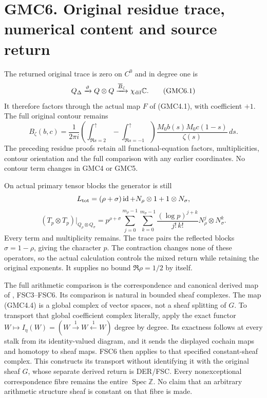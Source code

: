 \section{GMC6. Original residue trace, numerical content and source
return}\label{gmc6.-original-residue-trace-numerical-content-and-source-return}

The returned original trace is zero on \(C^0\) and in degree one is \[
Q_\Delta\xrightarrow{\vartheta}Q\otimes Q
\xrightarrow{\overline B_\zeta}\chi_{\rm dil}\mathbb C.
\tag{GMC6.1}
\] It therefore factors through the actual map \(F\) of (GMC4.1), with
coefficient \(+1\). The full original contour remains \[
B_\zeta(b,c)=\frac{1}{2\pi i}
\left(\int_{\Re s=2}^{\uparrow}-\int_{\Re s=-1}^{\uparrow}\right)
\frac{M_0b(s)M_0c(1-s)}{\zeta(s)}\,ds.
\tag{GMC6.2}
\] The preceding residue proofs retain all functional-equation factors,
multiplicities, contour orientation and the full comparison with any
earlier coordinates. No contour term changes in GMC4 or GMC5.

On actual primary tensor blocks the generator is still \[
L_{\rm tot}=(\rho+\sigma)\operatorname{id}
+N_\rho\otimes1+1\otimes N_\sigma,
\] \[
(T_p\otimes T_p)|_{Q_\rho\otimes Q_\sigma}
=p^{\rho+\sigma}
\sum_{j=0}^{m_\rho-1}\sum_{k=0}^{m_\sigma-1}
\frac{(\log p)^{j+k}}{j!\,k!}N_\rho^j\otimes N_\sigma^k.
\tag{GMC6.3}
\] Every term and multiplicity remains. The trace pairs the reflected
blocks \(\sigma=1-\rho\), giving the character \(p\). The contraction
changes none of these operators, so the actual calculation controls the
mixed return while retaining the original exponents. It supplies no
bound \(\Re\rho=1/2\) by itself.

The full arithmetic comparison is the correspondence and canonical
derived map of
\href{https://github.com/KokunoYumeto/zeta-function-research-reader/blob/main/workbenches/splitzero-tandem/continuations/20260925-full-source-tensor-and-original-divisor/counterfactual/DERIVED_RETURN_FULL_SOURCE_CORRESPONDENCE.md}{},
FSC3--FSC6. Its comparison is natural in bounded sheaf complexes. The
map (GMC4.4) is a global complex of vector spaces, not a sheaf splitting
of \(G\). To transport that global coefficient complex literally, apply
the exact functor
\(W\mapsto I_\eta(W)=(W\xrightarrow{1}W\xleftarrow{1}W)\) degree by
degree. Its exactness follows at every stalk from its identity-valued
diagram, and it sends the displayed cochain maps and homotopy to sheaf
maps. FSC6 then applies to that specified constant-sheaf complex. This
constructs its transport without identifying it with the original sheaf
\(G\), whose separate derived return is DER/FSC. Every nonexceptional
correspondence fibre remains the entire
\(\operatorname{Spec}\mathbb Z\). No claim that an arbitrary arithmetic
structure sheaf is constant on that fibre is made.

